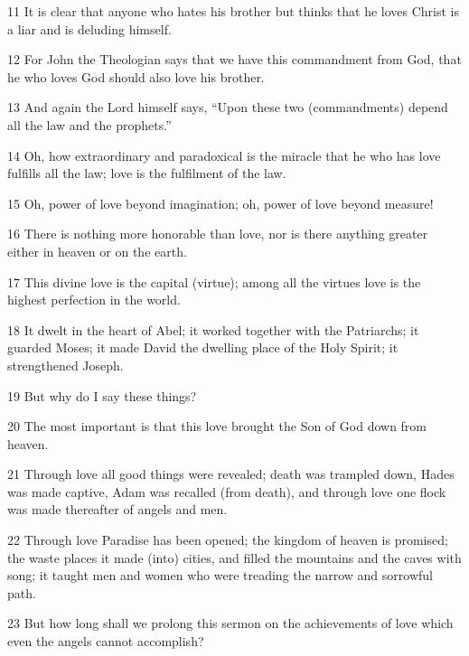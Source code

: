 \par 11 It is clear that anyone who hates his brother but thinks that he loves Christ is a liar and is deluding himself. 

\par 12 For John the Theologian says that we have this commandment from God, that he who loves God should also love his brother. 

\par 13 And again the Lord himself says, “Upon these two (commandments) depend all the law and the prophets.” 

\par 14 Oh, how extraordinary and paradoxical is the miracle that he who has love fulfills all the law; love is the fulfilment of the law. 

\par 15 Oh, power of love beyond imagination; oh, power of love beyond measure! 

\par 16 There is nothing more honorable than love, nor is there anything greater either in heaven or on the earth. 

\par 17 This divine love is the capital (virtue); among all the virtues love is the highest perfection in the world.

\par 18 It dwelt in the heart of Abel; it worked together with the Patriarchs; it guarded Moses; it made David the dwelling place of the Holy Spirit; it strengthened Joseph. 

\par 19 But why do I say these things? 

\par 20 The most important is that this love brought the Son of God down from heaven. 

\par 21 Through love all good things were revealed; death was trampled down, Hades was made captive, Adam was recalled (from death), and through love one flock was made thereafter of angels and men. 

\par 22 Through love Paradise has been opened; the kingdom of heaven is promised; the waste places it made (into) cities, and filled the mountains and the caves with song; it taught men and women who were treading the narrow and sorrowful path. 

\par 23 But how long shall we prolong this sermon on the achievements of love which even the angels cannot accomplish? 


